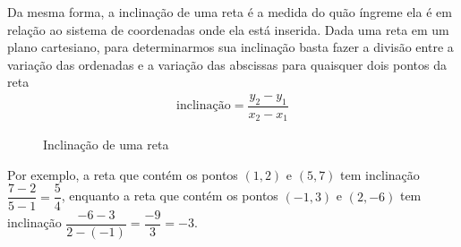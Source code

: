 Da mesma forma, a inclinação de uma reta é a medida do quão íngreme ela é em relação ao sistema de coordenadas onde ela está inserida. Dada uma reta em um plano cartesiano, para determinarmos sua inclinação basta fazer a divisão entre a variação das ordenadas e a variação das abscissas para quaisquer dois pontos da reta
\begin{equation*}
\begin{split}\text{inclinação}=\dfrac{y_2-y_1}{x_2-x_1}\end{split}
\end{equation*}
\begin{figure}[H]
\centering
\capstart

\caption{Inclinação de uma reta}\label{\detokenize{AF107-4:fig-inclina}}\label{\detokenize{AF107-4:id4}}\end{figure}

Por exemplo, a reta que contém os pontos \((1,2)\) e \((5,7)\) tem inclinação \(\dfrac{7-2}{5-1}=\dfrac 54\), enquanto a reta que contém os pontos \((-1,3)\) e \((2,-6)\) tem inclinação \(\dfrac{-6-3}{2-(-1)}=\dfrac{-9}{3}=-3\).

